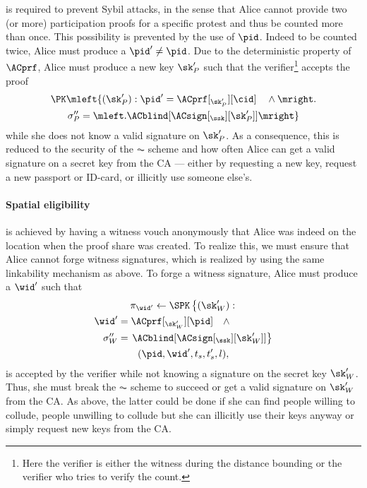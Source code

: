  is required to prevent Sybil attacks, in the sense
that Alice cannot provide two (or more) participation proofs for a
specific protest and thus be counted more than once.
This possibility is prevented by the use of \(\pid\).
Indeed to be counted twice, Alice must produce a \(\pid'\neq \pid\).
Due to the deterministic property of \(\ACprf\), Alice must produce a new key 
\(\sk_P'\) such that the verifier\footnote{%
  Here the verifier is either the witness during the distance bounding or the 
  verifier who tries to verify the count.
} accepts the proof
\begin{multline*}
\PK\mleft\{ (\sk_P') : \pid' = \ACprf[_{\sk_P'}][\cid] \quad \land \mright. \\
    \sigma_P'' = \mleft. \ACblind[\ACsign[_{\ssk}][\sk_P']] \mright\}
\end{multline*}
while she does not know a valid signature on \(\sk_P'\).
As a consequence, this is reduced to the security of the \(\AC\) scheme and how 
often Alice can get a valid signature on a secret key from the \ac{CA} --- 
either by requesting a new key, \eg request a new passport or ID-card, or 
illicitly use someone else's.

\paragraph{Spatial eligibility}%
\label{analysis-spatial}

 is achieved by having a witness vouch anonymously that Alice was indeed on the location when the proof share was created.
To realize this, we must ensure that Alice cannot forge witness signatures, 
which is realized by using the same linkability mechanism as above.
To forge a witness signature, Alice must produce a \(\wid'\) such that
\begin{multline*}
  \pi_{\wid'}\gets \SPK\left\{ (\sk_W') : \right. \\
    \begin{aligned}
      \wid' &= \ACprf[_{\sk_W'}][\pid] \quad \land \\
      \sigma_W'' &= \left. \ACblind[\ACsign[_{\ssk}][\sk_W']] \right\}
    \end{aligned} \\
      (\pid, \wid', t_s, t_s', l),
\end{multline*}
is accepted by the verifier while not knowing a signature on the secret key 
\(\sk_W'\).
Thus, she must break the \(\AC\) scheme to succeed or get a valid signature on \(\sk_W'\) from the \ac{CA}.
As above, the latter could be done if she can find people willing to collude, 
people unwilling to collude but she can illicitly use their keys anyway or 
simply request new keys from the \ac{CA}.

